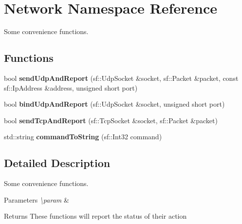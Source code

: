 \hypertarget{namespace_network}{\section{Network Namespace Reference}
\label{namespace_network}
}


Some convenience functions.  


\subsection*{Functions}
\begin{DoxyCompactItemize}
\item 
\hypertarget{namespace_network_a4540bb67890600a15431b2df5cc3ec62}{bool {\bfseries send\-Udp\-And\-Report} (sf\-::\-Udp\-Socket \&socket, sf\-::\-Packet \&packet, const sf\-::\-Ip\-Address \&address, unsigned short port)}\label{namespace_network_a4540bb67890600a15431b2df5cc3ec62}

\item 
\hypertarget{namespace_network_a1b065602d4d3c6a374b84f15ed7f1522}{bool {\bfseries bind\-Udp\-And\-Report} (sf\-::\-Udp\-Socket \&socket, unsigned short port)}\label{namespace_network_a1b065602d4d3c6a374b84f15ed7f1522}

\item 
\hypertarget{namespace_network_ae195e3b9e9cefb2f5b9405e6ecba8099}{bool {\bfseries send\-Tcp\-And\-Report} (sf\-::\-Tcp\-Socket \&socket, sf\-::\-Packet \&packet)}\label{namespace_network_ae195e3b9e9cefb2f5b9405e6ecba8099}

\item 
\hypertarget{namespace_network_a67211f44c69a714afd039c8d320b5a23}{std\-::string {\bfseries command\-To\-String} (sf\-::\-Int32 command)}\label{namespace_network_a67211f44c69a714afd039c8d320b5a23}

\end{DoxyCompactItemize}


\subsection{Detailed Description}
Some convenience functions. 
\begin{DoxyParams}{Parameters}
{\em \textbackslash{}param} & \\
\hline
\end{DoxyParams}
\begin{DoxyReturn}{Returns}
These functions will report the status of their action 
\end{DoxyReturn}
